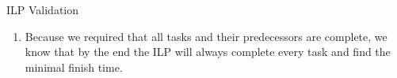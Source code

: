 \documentclass[10pt]{beamer}
\begin{document}
\begin{frame}{ILP Validation}
    \begin{enumerate}
        \item Because we required that all tasks and their predecessors are complete, we know that by the end the ILP will always complete every task and find the minimal finish time.
    \end{enumerate}
\end{frame}
\end{document}
